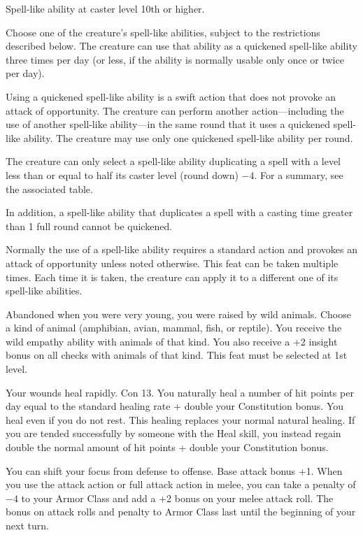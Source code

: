 
{}
{Spell-like ability at caster level 10th or higher.}
{Choose one of the creature's spell-like abilities, subject to the restrictions described below. The creature can use that ability as a quickened spell-like ability three times per day (or less, if the ability is normally usable only once or twice per day).

Using a quickened spell-like ability is a swift action that does not provoke an attack of opportunity. The creature can perform another action---including the use of another spell-like ability---in the same round that it uses a quickened spell-like ability. The creature may use only one quickened spell-like ability per round.

The creature can only select a spell-like ability duplicating a spell with a level less than or equal to half its caster level (round down) $-4$. For a summary, see the associated table.

In addition, a spell-like ability that duplicates a spell with a casting time greater than 1 full round cannot be quickened.}
{Normally the use of a spell-like ability requires a standard action and provokes an attack of opportunity unless noted otherwise.}
{This feat can be taken multiple times. Each time it is taken, the creature can apply it to a different one of its spell-like abilities.}

{Abandoned when you were very young, you were raised by wild animals.}{}
{Choose a kind of animal (amphibian, avian, mammal, fish, or reptile). You receive the wild empathy ability with animals of that kind. You also receive a +2 insight bonus on all  checks with animals of that kind.}{}
{This feat must be selected at 1st level.}

{Your wounds heal rapidly.}
{Con 13.}
{You naturally heal a number of hit points per day equal to the standard healing rate + double your Constitution bonus. You heal even if you do not rest. This healing replaces your normal natural healing. If you are tended successfully by someone with the Heal skill, you instead regain double the normal amount of hit points + double your Constitution bonus.}{}{}

{You can shift your focus from defense to offense.}
{Base attack bonus +1.}
{When you use the attack action or full attack action in melee, you can take a penalty of $-4$ to your Armor Class and add a +2 bonus on your melee attack roll. The bonus on attack rolls and penalty to Armor Class last until the beginning of your next turn.}{}{}

